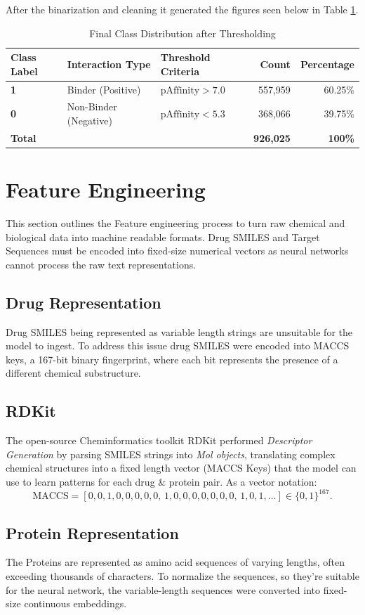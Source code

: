 After the binarization and cleaning it generated the figures seen below in Table \ref{tab:class_distribution}.
\begin{table}[H]
  \centering
  \caption{Final Class Distribution after Thresholding}
  \label{tab:class_distribution}
  \begin{tabular}{l l l r r}
    \toprule
    \textbf{Class Label} & \textbf{Interaction Type} & \textbf{Threshold Criteria} & \textbf{Count} & \textbf{Percentage} \\
    \midrule
    \textbf{1} & Binder (Positive) & $\mathrm{pAffinity} > 7.0$ & 557,959 & 60.25\% \\
    \textbf{0} & Non-Binder (Negative) & $\mathrm{pAffinity} < 5.3$ & 368,066 & 39.75\% \\
    \midrule
    \textbf{Total} & & & \textbf{926,025} & \textbf{100\%} \\
    \bottomrule
  \end{tabular}
\end{table}

\section{Feature Engineering}
This section outlines the Feature engineering process to turn raw chemical and biological data into machine readable formats. Drug SMILES and Target Sequences must be encoded into fixed-size numerical vectors as neural networks cannot process the raw text representations.
\subsection{Drug Representation}
Drug SMILES being represented as variable length strings are unsuitable for the model to ingest. To address this issue drug SMILES were encoded into MACCS keys, a 167-bit binary fingerprint, where each bit represents the presence of a different chemical substructure. 
\subsection{RDKit}
The open-source Cheminformatics toolkit RDKit performed \textit{Descriptor Generation} by parsing SMILES strings into \textit{Mol objects}, translating complex chemical structures into a fixed length vector (MACCS Keys) that the model can use to learn patterns for each drug \& protein pair. \citep{rdkit_doc}
As a vector notation:
\[
\text{MACCS} = [0,0,1,0,0,0,0,0,\,1,0,0,0,0,0,0,0,\,1,0,1,\dots] \in \{0,1\}^{167}.
\]
\subsection{Protein Representation} 
The Proteins are represented as amino acid sequences of varying lengths, often exceeding thousands of characters. To normalize the sequences, so they're suitable for the neural network, the variable-length sequences were converted into fixed-size continuous embeddings.
